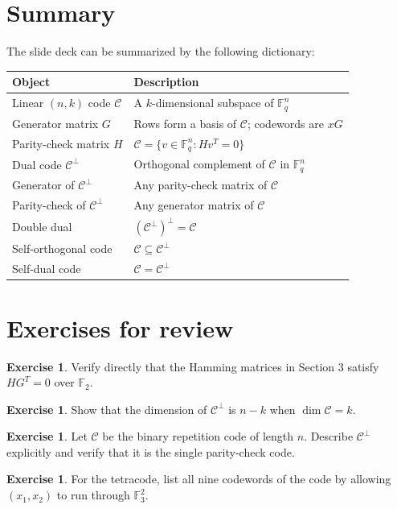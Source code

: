 \documentclass[11pt]{article}
\theoremstyle{definition}
\newtheorem{exercise}[proposition]{Exercise}
\theoremstyle{remark}
\newcommand{\F}{\mathbb{F}}
\newcommand{\code}{\mathcal{C}}
\newcommand{\dual}[1]{#1^{\perp}}
\begin{document}
\section{Summary}

The slide deck can be summarized by the following dictionary:

\begin{center}
\renewcommand{\arraystretch}{1.35}
\begin{tabular}{>{\raggedright\arraybackslash}p{} >{\raggedright\arraybackslash}p{}}
\toprule
\textbf{Object} & \textbf{Description} \\
\midrule
Linear $(n,k)$ code $\code$ & A $k$-dimensional subspace of $\F_q^n$ \\
Generator matrix $G$ & Rows form a basis of $\code$; codewords are $xG$ \\
Parity-check matrix $H$ & $\code=\{v\in\F_q^n:Hv^T=0\}$ \\
Dual code $\dual{\code}$ & Orthogonal complement of $\code$ in $\F_q^n$ \\
Generator of $\dual{\code}$ & Any parity-check matrix of $\code$ \\
Parity-check of $\dual{\code}$ & Any generator matrix of $\code$ \\
Double dual & $(\dual{\code})^{\perp}=\code$ \\
Self-orthogonal code & $\code\subseteq \dual{\code}$ \\
Self-dual code & $\code=\dual{\code}$ \\
\bottomrule
\end{tabular}
\end{center}

\section*{Exercises for review}

\begin{exercise}
Verify directly that the Hamming matrices in Section 3 satisfy $HG^T=0$ over $\F_2$.
\end{exercise}

\begin{exercise}
Show that the dimension of $\dual{\code}$ is $n-k$ when $\dim \code=k$.
\end{exercise}

\begin{exercise}
Let $\code$ be the binary repetition code of length $n$. Describe $\dual{\code}$ explicitly and verify that it is the single parity-check code.
\end{exercise}

\begin{exercise}
For the tetracode, list all nine codewords of the code by allowing $(x_1,x_2)$ to run through $\F_3^2$.
\end{exercise}
\end{document}
